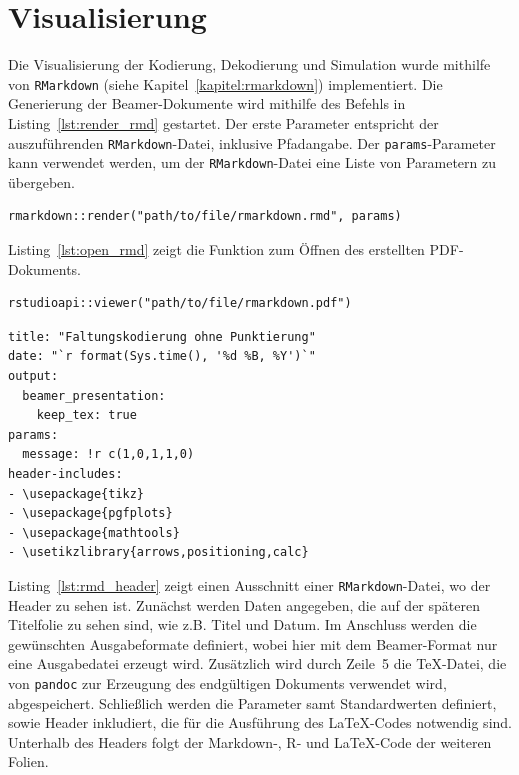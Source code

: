 \section{Visualisierung}
\label{kapitel:implementierung_visualisierung}
Die Visualisierung der Kodierung, Dekodierung und Simulation wurde mithilfe von \texttt{RMarkdown} (siehe Kapitel~\ref{kapitel:rmarkdown}) implementiert. Die Generierung der Beamer-Dokumente wird mithilfe des Befehls in Listing~\ref{lst:render_rmd} gestartet. Der erste Parameter entspricht der auszuführenden \texttt{RMarkdown}-Datei, inklusive Pfadangabe. Der \texttt{params}-Parameter kann verwendet werden, um der \texttt{RMarkdown}-Datei eine Liste von Parametern zu übergeben.
\begin{lstlisting}[caption=Erzeugen des Visualisierungs-Dokuments aus der RMD-Datei, label={lst:render_rmd}, float=!th]
rmarkdown::render("path/to/file/rmarkdown.rmd", params)
\end{lstlisting}
Listing~\ref{lst:open_rmd} zeigt die Funktion zum Öffnen des erstellten PDF-Dokuments.
\begin{lstlisting}[caption=Öffnen des Visualisierungs-Dokuments, label={lst:open_rmd}, float=!th]
rstudioapi::viewer("path/to/file/rmarkdown.pdf")
\end{lstlisting}

\begin{lstlisting}[caption=RMarkdown Header, label={lst:rmd_header}, float=!th]
title: "Faltungskodierung ohne Punktierung"
date: "`r format(Sys.time(), '%d %B, %Y')`"
output:
  beamer_presentation:
    keep_tex: true
params:
  message: !r c(1,0,1,1,0)
header-includes:
- \usepackage{tikz}
- \usepackage{pgfplots}
- \usepackage{mathtools}
- \usetikzlibrary{arrows,positioning,calc}
\end{lstlisting}
Listing~\ref{lst:rmd_header} zeigt einen Ausschnitt einer \texttt{RMarkdown}-Datei, wo der Header zu sehen ist. Zunächst werden Daten angegeben, die auf der späteren Titelfolie zu sehen sind, wie z.B. Titel und Datum. Im Anschluss werden die gewünschten Ausgabeformate definiert, wobei hier mit dem Beamer-Format nur eine Ausgabedatei erzeugt wird. Zusätzlich wird durch Zeile~5 die \TeX -Datei, die von \texttt{pandoc} zur Erzeugung des endgültigen Dokuments verwendet wird, abgespeichert. Schließlich werden die Parameter samt Standardwerten definiert, sowie Header inkludiert, die für die Ausführung des \LaTeX -Codes notwendig sind.
\\
Unterhalb des Headers folgt der Markdown-, R- und \LaTeX -Code der weiteren Folien. \cite{rmarkdown}